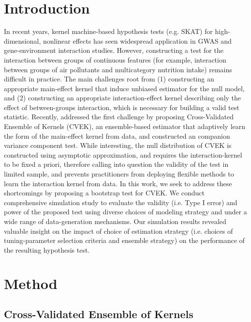 \documentclass[11pt]{article}
\begin{document}
\section{{\bf Introduction}}
In recent years, kernel machine-based hypothesis tests (e.g. SKAT) for high-dimensional, nonlinear effects has seen widespread application in GWAS and gene-environment interaction studies. However, constructing a test for the interaction between groups of continuous features (for example, interaction between groups of air pollutants and multicategory nutrition intake) remains difficult in practice. The main challenges root from (1) constructing an appropriate main-effect kernel that induce unbiased estimator for the null model, and (2) constructing an appropriate interaction-effect kernel describing only the effect of between-groups interaction, which is necessary for building a valid test statistic. Recently, \citep{liu_robust_2017} addressed the first challenge by proposing Cross-Validated Ensemble of Kernels (CVEK), an ensemble-based estimator that adaptively learn the form of the main-effect kernel from data, and constructed an companion variance component test. While interesting, the null distribution of CVEK is constructed using asymptotic approximation, and requires the interaction-kernel to be fixed a priori, therefore calling into question the validity of the test in limited sample, and prevents practitioners from deploying flexible methods to learn the interaction kernel from data. In this work, we seek to address these shortcomings by proposing a bootstrap test for CVEK. We conduct comprehensive simulation study to evaluate the validity (i.e. Type I error) and power of the proposed test using diverse choices of modeling strategy and under a wide range of data-generation mechanisms. Our simulation results revealed valuable insight on the impact of choice of estimation strategy (i.e. choices of tuning-parameter selection criteria and ensemble strategy) on the performance of the resulting hypothesis test.

\newpage
\section{{\bf Method}}
\subsection{\textbf{Cross-Validated Ensemble of Kernels}}
\setcounter{equation}{0}
\renewcommand{\theequation}{2.1.\arabic{equation}}
\end{document}
